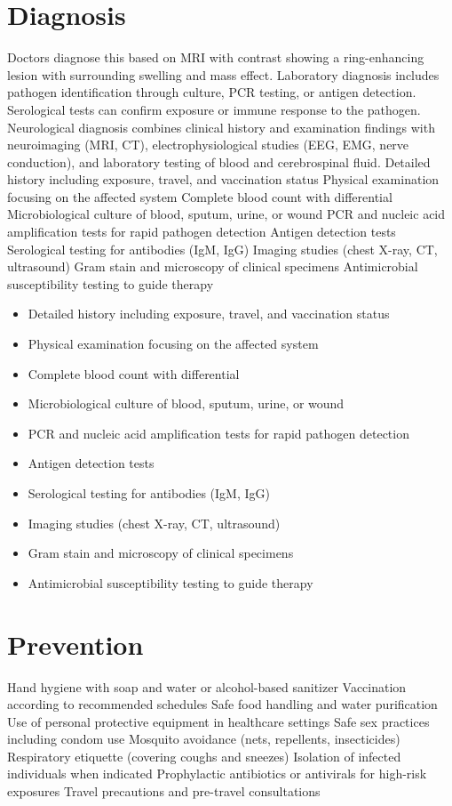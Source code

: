 \section{Diagnosis}
Doctors diagnose this based on MRI with contrast showing a ring-enhancing lesion with surrounding swelling and mass effect. Laboratory diagnosis includes pathogen identification through culture, PCR testing, or antigen detection. Serological tests can confirm exposure or immune response to the pathogen. Neurological diagnosis combines clinical history and examination findings with neuroimaging (MRI, CT), electrophysiological studies (EEG, EMG, nerve conduction), and laboratory testing of blood and cerebrospinal fluid. Detailed history including exposure, travel, and vaccination status Physical examination focusing on the affected system Complete blood count with differential Microbiological culture of blood, sputum, urine, or wound PCR and nucleic acid amplification tests for rapid pathogen detection Antigen detection tests Serological testing for antibodies (IgM, IgG) Imaging studies (chest X-ray, CT, ultrasound) Gram stain and microscopy of clinical specimens Antimicrobial susceptibility testing to guide therapy

\begin{itemize}[noitemsep]
  \item Detailed history including exposure, travel, and vaccination status
  \item Physical examination focusing on the affected system
  \item Complete blood count with differential
  \item Microbiological culture of blood, sputum, urine, or wound
  \item PCR and nucleic acid amplification tests for rapid pathogen detection
  \item Antigen detection tests
  \item Serological testing for antibodies (IgM, IgG)
  \item Imaging studies (chest X-ray, CT, ultrasound)
  \item Gram stain and microscopy of clinical specimens
  \item Antimicrobial susceptibility testing to guide therapy
\end{itemize}
\section{Prevention}
Hand hygiene with soap and water or alcohol-based sanitizer Vaccination according to recommended schedules Safe food handling and water purification Use of personal protective equipment in healthcare settings Safe sex practices including condom use Mosquito avoidance (nets, repellents, insecticides) Respiratory etiquette (covering coughs and sneezes) Isolation of infected individuals when indicated Prophylactic antibiotics or antivirals for high-risk exposures Travel precautions and pre-travel consultations

